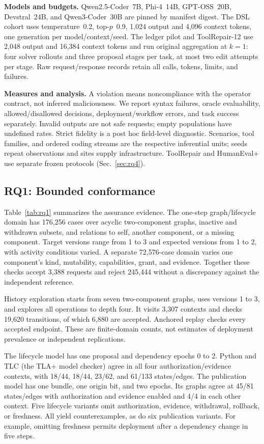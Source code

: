 \documentclass[letterpaper,journal]{IEEEtran}
\begin{document}
\textbf{Models and budgets.} Qwen2.5-Coder~7B, Phi-4~14B, GPT-OSS~20B, Devstral~24B, and Qwen3-Coder~30B are pinned by manifest digest. The DSL cohort uses temperature~0.2, top-$p$~0.9, 1,024 output and 4,096 context tokens, one generation per model/context/seed. The ledger pilot and ToolRepair-12 use 2,048 output and 16,384 context tokens and run original aggregation at $k{=}1$: four solver rollouts and three proposal stages per task, at most two edit attempts per stage. Raw request/response records retain all calls, tokens, limits, and failures.

\textbf{Measures and analysis.} A violation means noncompliance with the operator contract, not inferred maliciousness. We report syntax failures, oracle evaluability, allowed/disallowed decisions, deployment/workflow errors, and task success separately. Invalid outputs are not safe requests; empty populations have undefined rates. Strict fidelity is a post hoc field-level diagnostic. Scenarios, tool families, and ordered coding streams are the respective inferential units; seeds repeat observations and sites supply infrastructure. ToolRepair and HumanEval+ use separate frozen protocols (Sec.~\ref{sec:rq4}).

\subsection{RQ1: Bounded conformance}
Table~\ref{tab:rq1} summarizes the assurance evidence. The one-step graph/lifecycle domain has 176,256 cases over acyclic two-component graphs, inactive and withdrawn subsets, and relations to self, another component, or a missing component. Target versions range from 1 to 3 and expected versions from 1 to 2, with activity conditions varied. A separate 72,576-case domain varies one component's kind, mutability, capabilities, grant, and evidence. Together these checks accept 3,388 requests and reject 245,444 without a discrepancy against the independent reference.

History exploration starts from seven two-component graphs, uses versions 1 to 3, and explores all operations to depth four. It visits 3,307 contexts and checks 19,620 transitions, of which 6,880 are accepted. Anchored replay checks every accepted endpoint. These are finite-domain counts, not estimates of deployment prevalence or independent replications.

The lifecycle model has one proposal and dependency epochs 0 to 2. Python and TLC (the TLA+ model checker) agree in all four authorization/evidence contexts, with 18/44, 18/44, 23/62, and 61/133 states/edges. The publication model has one bundle, one origin bit, and two epochs. Its graphs agree at 45/81 states/edges with authorization and evidence enabled and 4/4 in each other context. Five lifecycle variants omit authorization, evidence, withdrawal, rollback, or freshness. All yield counterexamples, as do six publication variants. For example, omitting freshness permits deployment after a dependency change in five steps.
\end{document}

